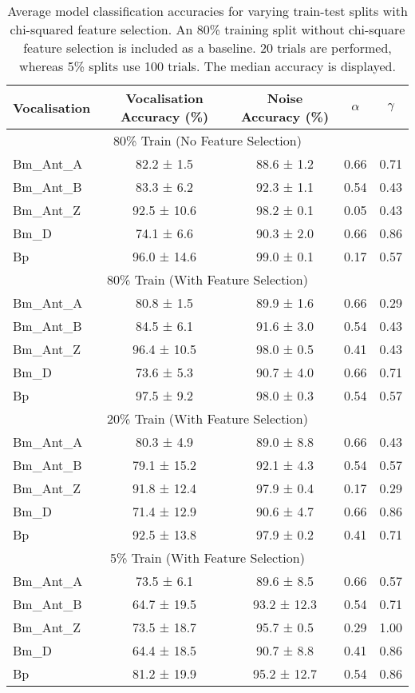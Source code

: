 {\begin{table}[]
\caption[Average model classification accuracies for varying train-test splits with chi-squared feature selection.]{Average model classification accuracies for varying train-test splits with chi-squared feature selection. An 80\% training split without chi-square feature selection is included as a baseline. 20 trials are performed, whereas 5\% splits use 100 trials. The median accuracy is displayed.}
\label{tab:clsres}
\renewcommand{\arraystretch}{0.8}
\begin{tabular}{lcccc}
\textbf{Vocalisation} & \textbf{Vocalisation Accuracy (\%)} & \textbf{Noise Accuracy (\%)} & $\alpha$ & $\gamma$  \\ \hline  
\multicolumn{5}{c}{80\% Train (No Feature Selection)} \\ \hline 
Bm\_Ant\_A & 82.2 ± 1.5  & 88.6 ± 1.2 & 0.66 & 0.71 \\
Bm\_Ant\_B & 83.3 ± 6.2  & 92.3 ± 1.1 & 0.54 & 0.43 \\
Bm\_Ant\_Z & 92.5 ± 10.6 & 98.2 ± 0.1 & 0.05 & 0.43 \\
Bm\_D      & 74.1 ± 6.6  & 90.3 ± 2.0 & 0.66 & 0.86 \\
Bp         & 96.0 ± 14.6 & 99.0 ± 0.1 & 0.17 & 0.57\\  \hline 

\multicolumn{5}{c}{80\% Train (With Feature Selection)} \\ \hline 
Bm\_Ant\_A & 80.8 ± 1.5  & 89.9 ± 1.6 & 0.66 & 0.29 \\
Bm\_Ant\_B & 84.5 ± 6.1  & 91.6 ± 3.0 & 0.54 & 0.43 \\
Bm\_Ant\_Z & 96.4 ± 10.5 & 98.0 ± 0.5 & 0.41 & 0.43 \\
Bm\_D      & 73.6 ± 5.3  & 90.7 ± 4.0 & 0.66 & 0.71 \\
Bp         & 97.5 ± 9.2  & 98.0 ± 0.3 & 0.54 & 0.57 \\ \hline     
\multicolumn{5}{c}{20\% Train (With Feature Selection)} \\ \hline 
Bm\_Ant\_A & 80.3 ± 4.9  & 89.0 ± 8.8 & 0.66 & 0.43 \\
Bm\_Ant\_B & 79.1 ± 15.2 & 92.1 ± 4.3 & 0.54 & 0.57 \\
Bm\_Ant\_Z & 91.8 ± 12.4 & 97.9 ± 0.4 & 0.17 & 0.29 \\
Bm\_D      & 71.4 ± 12.9 & 90.6 ± 4.7 & 0.66 & 0.86 \\
Bp         & 92.5 ± 13.8 & 97.9 ± 0.2 & 0.41 & 0.71\\ \hline  
\multicolumn{5}{c}{5\% Train (With Feature Selection)} \\ \hline 
Bm\_Ant\_A & 73.5 ± 6.1  & 89.6 ± 8.5  & 0.66 & 0.57 \\
Bm\_Ant\_B & 64.7 ± 19.5 & 93.2 ± 12.3 & 0.54 & 0.71 \\
Bm\_Ant\_Z & 73.5 ± 18.7 & 95.7 ± 0.5  & 0.29 & 1.00 \\
Bm\_D      & 64.4 ± 18.5 & 90.7 ± 8.8  & 0.41 & 0.86 \\
Bp         & 81.2 ± 19.9 & 95.2 ± 12.7 & 0.54 & 0.86 \\  \hline 


\end{tabular}
\end{table}}
